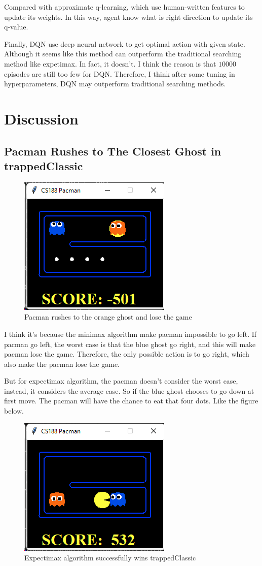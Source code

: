 \documentclass{article}[12pt]
\begin{document}
Compared with approximate q-learning, which use human-written features to update its weights. In this way, agent know what is right direction to update its q-value. 

Finally, DQN use deep neural network to get optimal action with given state. Although it seems like this method can outperform the traditional searching method like expetimax. In fact, it doesn't. I think the reason is that $10000$ episodes are still too few for DQN. Therefore, I think after some tuning in hyperparameters, DQN may outperform traditional searching methods.


\section{Discussion}
\subsection{Pacman Rushes to The Closest Ghost in trappedClassic}


\begin{figure}[H]
\centering
\includegraphics[width=0.3\linewidth]{screenshot002}
\caption{Pacman rushes to the orange ghost and lose the game}
\label{fig:screenshot002}
\end{figure}

I think it's because the minimax algorithm make pacman impossible to go left. If pacman go left, the worst case is that the blue ghost go right, and this will make pacman lose the game. Therefore, the only possible action is to go right, which also make the pacman lose the game.

But for expectimax algorithm, the pacman doesn't consider the worst case, instead, it considers the average case. So if the blue ghost chooses to go down at first move. The pacman will have the chance to eat that four dots. Like the figure below.

\begin{figure}[H]
\centering
\includegraphics[width=0.3\linewidth]{screenshot004}
\caption{Expectimax algorithm successfully wins trappedClassic}
\label{fig:screenshot004}
\end{figure}
\end{document}
